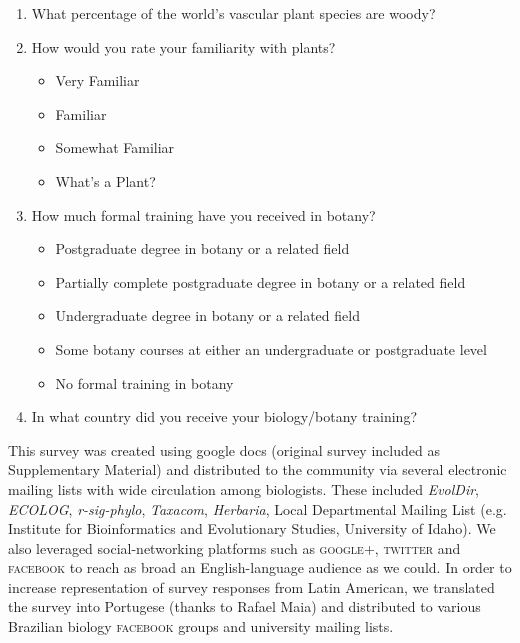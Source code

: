 \documentclass[12pt]{article}
\begin{document}
\begin{enumerate}

\item What percentage of the world's vascular plant species are woody?

\item How would you rate your familiarity with plants?

	\begin{itemize}
	
		\item Very Familiar
	
		\item Familiar
	
		\item Somewhat Familiar
	
		\item What's a Plant?
	
	\end{itemize}
	
\item How much formal training have you received in botany?

	\begin{itemize}
	
		\item Postgraduate degree in botany or a related field
		
		\item Partially complete postgraduate degree in botany or a related field
		
		\item Undergraduate degree in botany or a related field
		
		\item Some botany courses at either an undergraduate or postgraduate level
		
		\item No formal training in botany
		
	\end{itemize}
	
\item In what country did you receive your biology/botany training?

\end{enumerate}

This survey was created using google docs (original survey included as Supplementary Material) and distributed to the community via several electronic mailing lists with wide circulation among biologists. These included \emph{EvolDir}, \emph{ECOLOG}, \emph{r-sig-phylo}, \emph{Taxacom}, \emph{Herbaria}, Local Departmental Mailing List (e.g. Institute for Bioinformatics and Evolutionary Studies, University of Idaho). We also leveraged social-networking platforms such as \textsc{google+}, \textsc{twitter} and \textsc{facebook} to reach as broad an English-language audience as we could. In order to increase representation of survey responses from Latin American, we translated the survey into Portugese (thanks to Rafael Maia) and distributed to various Brazilian biology \textsc{facebook} groups and university mailing lists.
\end{document}
